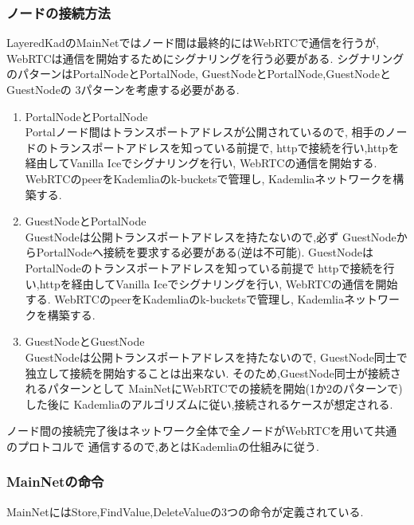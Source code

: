 \documentclass[sotsuron]{jcsie}
\begin{document}
\subsubsection{ノードの接続方法}
LayeredKadのMainNetではノード間は最終的にはWebRTCで通信を行うが,
WebRTCは通信を開始するためにシグナリングを行う必要がある.
シグナリングのパターンはPortalNodeとPortalNode,
GuestNodeとPortalNode,GuestNodeとGuestNodeの
3パターンを考慮する必要がある.

\begin{enumerate}
	\item {PortalNodeとPortalNode}\\
	      Portalノード間はトランスポートアドレスが公開されているので,
	      相手のノードのトランスポートアドレスを知っている前提で,
	      httpで接続を行い,httpを経由してVanilla Iceでシグナリングを行い,
	      WebRTCの通信を開始する.
	      WebRTCのpeerをKademliaのk-bucketsで管理し,
	      Kademliaネットワークを構築する.
	      \\
	\item {GuestNodeとPortalNode}\\
	      GuestNodeは公開トランスポートアドレスを持たないので,必ず
	      GuestNodeからPortalNodeへ接続を要求する必要がある(逆は不可能).
	      GuestNodeはPortalNodeのトランスポートアドレスを知っている前提で
	      httpで接続を行い,httpを経由してVanilla Iceでシグナリングを行い,
	      WebRTCの通信を開始する.
	      WebRTCのpeerをKademliaのk-bucketsで管理し,
	      Kademliaネットワークを構築する.
	      \\
	\item {GuestNodeとGuestNode}\\
	      GuestNodeは公開トランスポートアドレスを持たないので,
	      GuestNode同士で独立して接続を開始することは出来ない.
	      そのため,GuestNode同士が接続されるパターンとして
	      MainNetにWebRTCでの接続を開始(1か2のパターンで)した後に
	      Kademliaのアルゴリズムに従い,接続されるケースが想定される.
\end{enumerate}

ノード間の接続完了後はネットワーク全体で全ノードがWebRTCを用いて共通のプロトコルで
通信するので,あとはKademliaの仕組みに従う.

\subsubsection{MainNetの命令}
MainNetにはStore,FindValue,DeleteValueの3つの命令が定義されている.
\end{document}
